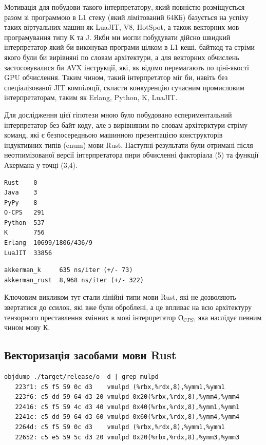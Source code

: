 Мотивація для побудови такого інтерпретатору, який повністю розміщується
разом зі программою в L1 стеку (який лімітований 64КБ) базується на успіху
таких віртуальних машин як LuaJIT, V8, HotSpot, а також векторних мов
програмування типу К та J. Якби ми могли побудувати дійсно швидкий інтерпретатор
який би виконував програми цілком в L1 кеші, байткод та стріми якого були би
вирівняні по словам архітектури, а для векторних обчислень застосовувалися би AVX інструкції,
які, як відомо перемагають по ціні-якості GPU обчислення. Таким чином, такий
інтерпретатор міг би, навіть без спеціалізованої JIT компіляції, скласти
конкуренцію сучасним промисловим інтерпретаторам, таким як Erlang, Python, K, LuaJIT.

Для дослідження цієї гіпотези мною було побудовано еспериментальний інтерпретатор
без байт-коду, але з вирівняним по словам архітерктури стріму команд, які є
безпосередньою машинною презентацією конструкторів індуктивних типів (enum) мови Rust.
Наступні результати були отримані після неотпимізованої версії інтерпретатора
пнри обчисленні факторіала (5) та функції Акермана у точці (3,4).

\begin{lstlisting}
Rust    0
Java    3
PyPy    8
O-CPS   291
Python  537
K       756
Erlang  10699/1806/436/9
LuaJIT  33856
\end{lstlisting}

\begin{lstlisting}
akkerman_k     635 ns/iter (+/- 73)
akkerman_rust  8,968 ns/iter (+/- 322)
\end{lstlisting}

Ключовим викликом тут стали лінійні типи мови Rust, які не дозволяють
звертатися до ссилок, які вже були оброблені, а це впливає на всю
архітектуру тензорного преставлення змінних в мові інтерпретатор $О_{CPS}$,
яка наслідує певним чином мову К.

\subsection{Векторизація засобами мови Rust}

\begin{lstlisting}
objdump ./target/release/o -d | grep mulpd
   223f1: c5 f5 59 0c d3    vmulpd (%rbx,%rdx,8),%ymm1,%ymm1
   223f6: c5 dd 59 64 d3 20 vmulpd 0x20(%rbx,%rdx,8),%ymm4,%ymm4
   22416: c5 f5 59 4c d3 40 vmulpd 0x40(%rbx,%rdx,8),%ymm1,%ymm1
   2241c: c5 dd 59 64 d3 60 vmulpd 0x60(%rbx,%rdx,8),%ymm4,%ymm4
   2264d: c5 f5 59 0c d3    vmulpd (%rbx,%rdx,8),%ymm1,%ymm1
   22652: c5 e5 59 5c d3 20 vmulpd 0x20(%rbx,%rdx,8),%ymm3,%ymm3
\end{lstlisting}

